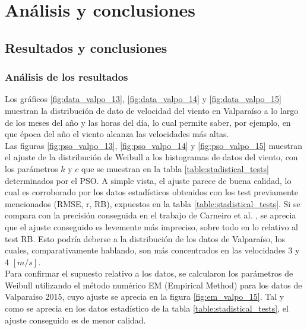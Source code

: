 
\chapter{Análisis y conclusiones}

\section{Resultados y conclusiones}
\subsection{Análisis de los resultados}
Los gráficos \ref{fig:data_valpo_13}, \ref{fig:data_valpo_14} y \ref{fig:data_valpo_15} muestran la distribución de dato de velocidad del viento en Valparaíso a lo largo de los meses del año y las horas del día, lo cual permite saber, por ejemplo, en que época del año el viento alcanza las velocidades más altas.\\
Las figuras \ref{fig:pso_valpo_13}, \ref{fig:pso_valpo_14} y \ref{fig:pso_valpo_15} muestran el ajuste de la distribución de Weibull a los histogramas de datos del viento, con los parámetros $k$ y $c$  que se muestran en la tabla \ref{table:stadistical_tests} determinados por el PSO. A simple vista, el ajuste parece de buena calidad, lo cual es corroborado por los datos estadísticos obtenidos con los test previamente mencionados (RMSE, r, RB), expuestos en la tabla \ref{table:stadistical_tests}. Si se compara con la precisión conseguida en el trabajo de Carneiro et al. \cite{Carneiro15}, se aprecia que el ajuste conseguido es levemente más impreciso, sobre todo en lo relativo al test RB. Esto podría deberse a la distribución de los datos de Valparaíso, los cuales, comparativamente hablando, son más concentrados en las velocidades  3 y 4 $[m/s]$.\\
Para confirmar el supuesto relativo a los datos, se calcularon los parámetros de Weibull utilizando el método numérico EM (Empirical Method) para los datos de Valparaíso 2015, cuyo ajuste se aprecia en la figura \ref{fig:em_valpo_15}. Tal y como se aprecia en los datos estadístico de la tabla \ref{table:stadistical_tests}, el ajuste conseguido es de menor calidad.\\
